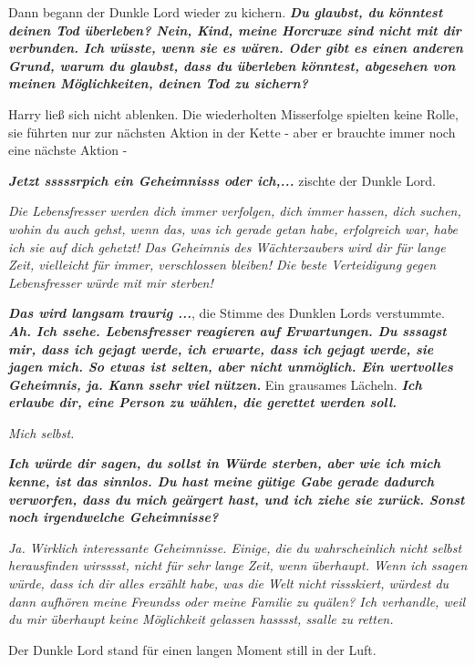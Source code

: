 Dann begann der Dunkle Lord wieder zu kichern. \glqq{}\textbf{\emph{Du glaubst,
du könntest deinen Tod überleben? Nein, Kind, meine Horcruxe sind nicht mit dir
verbunden. Ich wüsste, wenn sie es wären. Oder gibt es einen anderen Grund,
warum du glaubst, dass du überleben könntest, abgesehen von meinen
Möglichkeiten, deinen Tod zu sichern?}}\grqq{}

Harry ließ sich nicht ablenken. Die wiederholten Misserfolge spielten keine
Rolle, sie führten nur zur nächsten Aktion in der Kette - aber er brauchte immer
noch eine nächste Aktion -

\glqq{}\textbf{\emph{Jetzt sssssrpich ein Geheimnisss oder ich,...}}\grqq{}
zischte der Dunkle Lord.

\glqq{}\emph{Die Lebensfresser werden dich immer verfolgen, dich immer hassen,
dich suchen, wohin du auch gehst, wenn das, was ich gerade getan habe,
erfolgreich war, habe ich sie auf dich gehetzt! Das Geheimnis des Wächterzaubers
wird dir für lange Zeit, vielleicht für immer, verschlossen bleiben! Die beste
Verteidigung gegen Lebensfresser würde mit mir sterben!}\grqq{}

\glqq{}\textbf{\emph{Das wird langsam traurig ...}}\grqq{}, die Stimme des Dunklen
Lords verstummte. \glqq{}\textbf{\emph{Ah. Ich ssehe. Lebensfresser reagieren auf
Erwartungen. Du sssagst mir, dass ich gejagt werde, ich erwarte, dass ich gejagt
werde, sie jagen mich. So etwas ist selten, aber nicht unmöglich. Ein wertvolles
Geheimnis, ja. Kann ssehr viel nützen.}}\grqq{} Ein grausames Lächeln. \glqq{}
\textbf{\emph{Ich erlaube dir, eine Person zu wählen, die gerettet werden
soll.}}\grqq{}

\glqq{}\emph{Mich selbst.}\grqq{}

\glqq{}\textbf{\emph{Ich würde dir sagen, du sollst in Würde sterben, aber wie
ich mich kenne, ist das sinnlos. Du hast meine gütige Gabe gerade dadurch
verworfen, dass du mich geärgert hast, und ich ziehe sie zurück. Sonst noch
irgendwelche Geheimnisse?}}\grqq{}

\glqq{}\emph{Ja. Wirklich interessante Geheimnisse. Einige, die du wahrscheinlich
nicht selbst herausfinden wirsssst, nicht für sehr lange Zeit, wenn überhaupt.
Wenn ich ssagen würde, dass ich dir alles erzählt habe, was die Welt nicht
rissskiert, würdest du dann aufhören meine Freundss oder meine Familie zu
quälen? Ich verhandle, weil du mir überhaupt keine Möglichkeit gelassen hasssst,
ssalle zu retten.}\grqq{}

Der Dunkle Lord stand für einen langen Moment still in der Luft.

